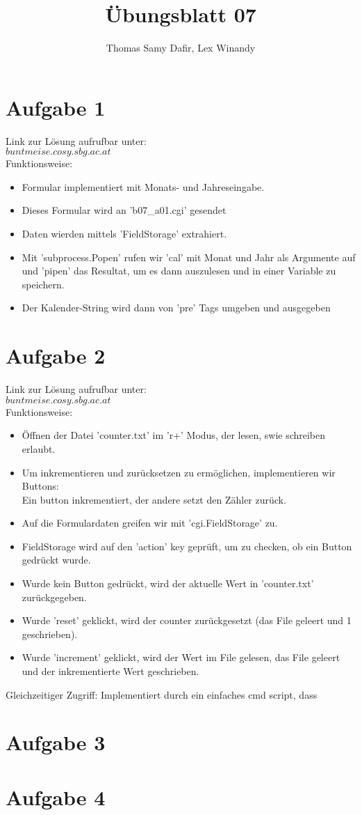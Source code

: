 \documentclass[12pt, a4paper]{report}
\title{Übungsblatt 07}
\author{Thomas Samy Dafir, Lex Winandy}
\date{}
\begin{document}
\maketitle

\section*{Aufgabe 1}
Link zur Lösung aufrufbar unter:\\
$buntmeise.cosy.sbg.ac.at$\\
Funktionsweise:\\
\begin{itemize}
	\item Formular implementiert mit Monats- und Jahreseingabe.
	\item Dieses Formular wird an 'b07\_a01.cgi' gesendet
	\item Daten wierden mittels 'FieldStorage' extrahiert.
	\item Mit 'subprocess.Popen' rufen wir 'cal' mit Monat und Jahr als Argumente auf und 'pipen' das Resultat, um
	es dann auszulesen und in einer Variable zu speichern.
	\item Der Kalender-String wird dann von 'pre' Tags umgeben und ausgegeben
\end{itemize}

\section*{Aufgabe 2}
Link zur Lösung aufrufbar unter:\\
$buntmeise.cosy.sbg.ac.at$\\
Funktionsweise:\\
\begin{itemize}
	\item Öffnen der Datei 'counter.txt' im 'r+' Modus, der lesen, swie schreiben erlaubt.
	\item Um inkrementieren und zurücksetzen zu ermöglichen, implementieren wir Buttons:\\
	Ein button inkrementiert, der andere setzt den Zähler zurück.
	\item Auf die Formulardaten greifen wir mit 'cgi.FieldStorage' zu.
	\item FieldStorage wird auf den 'action' key geprüft, um zu checken, ob ein Button gedrückt wurde.
	\item Wurde kein Button gedrückt, wird der aktuelle Wert in 'counter.txt' zurückgegeben.
	\item Wurde 'reset' geklickt, wird der counter zurückgesetzt (das File geleert und 1 geschrieben).
	\item Wurde 'increment' geklickt, wird der Wert im File gelesen, das File geleert und der inkrementierte
	Wert geschrieben.
\end{itemize}

Gleichzeitiger Zugriff:
Implementiert durch ein einfaches cmd script, dass 




\section*{Aufgabe 3}

\section*{Aufgabe 4}
\end{document}
